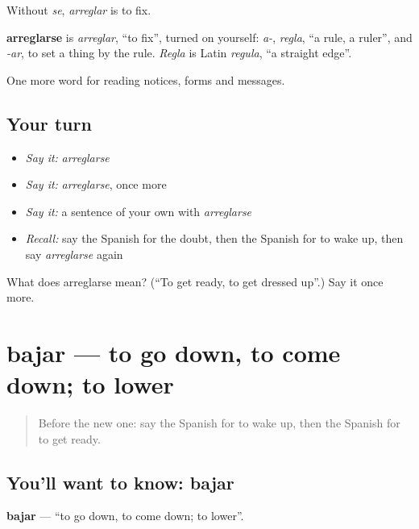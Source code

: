 Without \emph{se}, \emph{arreglar} is to fix.

\begin{cousinweb}
\textbf{arreglarse} is \emph{arreglar}, \textquotedblleft{}to fix\textquotedblright{}, turned on yourself: \emph{a-}, \emph{regla}, \textquotedblleft{}a rule, a ruler\textquotedblright{}, and \emph{-ar}, to set a thing by the rule. \emph{Regla} is Latin \emph{regula}, \textquotedblleft{}a straight edge\textquotedblright{}.
\end{cousinweb}

\begin{grammarlens}[title={What you've built}]
One more word for reading notices, forms and messages.
\end{grammarlens}

\subsection*{Your turn}
\begin{itemize}
\raggedright
  \item \emph{Say it:} \emph{arreglarse}
  \item \emph{Say it:} \emph{arreglarse}, once more
  \item \emph{Say it:} a sentence of your own with \emph{arreglarse}
  \item \emph{Recall:} say the Spanish for the doubt, then the Spanish for to wake up, then say \emph{arreglarse} again
\end{itemize}

\begin{tcolorbox}[breakable,colback=teal!4,colframe=teal!35!black,title={Before you move on}]
What does arreglarse mean? (\textquotedblleft{}To get ready, to get dressed up\textquotedblright{}.) Say it once more.
\end{tcolorbox}
\section[bajar]{bajar — to go down, to come down; to lower}

\label{lesson:ES-C494-bajar}



\begin{quote}
Before the new one: say the Spanish for to wake up, then the Spanish for to get ready.
\end{quote}

\subsection*{You'll want to know: bajar}
\textbf{bajar} — \textquotedblleft{}to go down, to come down; to lower\textquotedblright{}.


